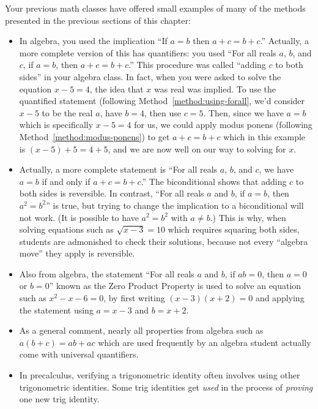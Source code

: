 \documentclass{book}
\theoremstyle{ekimcustom}
\begin{document}
Your previous math classes have offered small examples of many of the methods presented in the previous sections of this chapter:
\begin{itemize}

\item In algebra, you used the implication ``If $a=b$ then $a+c=b+c$.'' Actually, a more complete version of this has quantifiers: you used ``For all reals $a$, $b$, and $c$, if $a=b$, then $a+c=b+c$.'' This procedure was called ``adding $c$ to both sides'' in your algebra class. In fact, when you were asked to solve the equation $x-5=4$, the idea that $x$ was real was implied. To use the quantified statement (following Method~\ref{method:using-forall}, we'd consider $x-5$ to be the real $a$, have $b=4$, then use $c=5$. Then, since we have $a=b$ which is specifically $x-5=4$ for us, we could apply modus ponens (following Method~\ref{method:modus-ponens}) to get $a+c=b+c$ which in this example is $(x-5)+5=4+5$, and we are now well on our way to solving for $x$.

\item Actually, a more complete statement is ``For all reals $a$, $b$, and $c$, we have $a=b$ if and only if $a+c=b+c$.'' The biconditional shows that adding $c$ to both sides is reversible. In contrast, ``For all reals $a$ and $b$, if $a=b$, then $a^2=b^2$'' is true, but trying to change the implication to a biconditional will not work. (It is possible to have $a^2=b^2$ with $a \not= b$.) This is why, when solving equations such as $\sqrt{x-3}=10$ which requires squaring both sides, students are admonished to check their solutions, because not every ``algebra move'' they apply is reversible.

\item Also from algebra, the statement ``For all reals $a$ and $b$, if $ab=0$, then $a=0$ or $b=0$'' known as the Zero Product Property is used to solve an equation such as $x^2-x-6=0$, by first writing $(x-3)(x+2)=0$ and applying the statement using $a=x-3$ and $b=x+2$.

\item As a general comment, nearly all properties from algebra such as $a(b+c)=ab+ac$ which are used frequently by an algebra student actually come with universal quantifiers.

\item In precalculus, verifying a trigonometric identity often involves using other trigonometric identities. Some trig identities get \emph{used} in the process of \emph{proving} one new trig identity.


\end{itemize}
\end{document}
